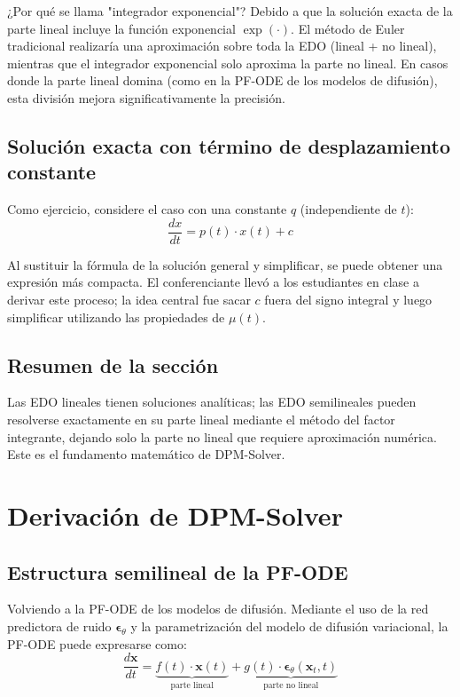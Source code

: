\documentclass[a4paper]{article}
\begin{document}
\begin{knowledgebox}{¿Por qué se llama "integrador exponencial"?}
Debido a que la solución exacta de la parte lineal incluye la función exponencial $\exp(\cdot)$. El método de Euler tradicional realizaría una aproximación sobre toda la EDO (lineal + no lineal), mientras que el integrador exponencial solo aproxima la parte no lineal. En casos donde la parte lineal domina (como en la PF-ODE de los modelos de difusión), esta división mejora significativamente la precisión.
\end{knowledgebox}

\subsection{Solución exacta con término de desplazamiento constante}

Como ejercicio, considere el caso con una constante $q$ (independiente de $t$):
$$\frac{dx}{dt} = p(t) \cdot x(t) + c$$

Al sustituir la fórmula de la solución general y simplificar, se puede obtener una expresión más compacta. El conferenciante llevó a los estudiantes en clase a derivar este proceso; la idea central fue sacar $c$ fuera del signo integral y luego simplificar utilizando las propiedades de $\mu(t)$.

\subsection{Resumen de la sección}

Las EDO lineales tienen soluciones analíticas; las EDO semilineales pueden resolverse exactamente en su parte lineal mediante el método del factor integrante, dejando solo la parte no lineal que requiere aproximación numérica. Este es el fundamento matemático de DPM-Solver.
\section{Derivación de DPM-Solver}

\subsection{Estructura semilineal de la PF-ODE}

Volviendo a la PF-ODE de los modelos de difusión. Mediante el uso de la red predictora de ruido $\boldsymbol{\epsilon}_\theta$ y la parametrización del modelo de difusión variacional, la PF-ODE puede expresarse como:
$$\frac{d\mathbf{x}}{dt} = \underbrace{f(t) \cdot \mathbf{x}(t)}_{\text{parte lineal}} + \underbrace{g(t) \cdot \boldsymbol{\epsilon}_\theta(\mathbf{x}_t, t)}_{\text{parte no lineal}}$$
\end{document}
